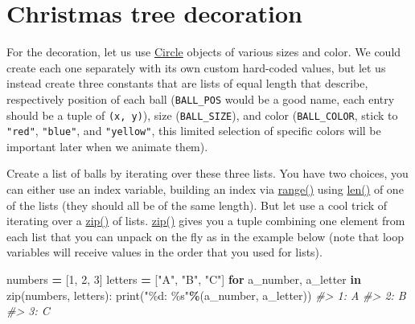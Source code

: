 \documentclass[
]{book}
\newenvironment{Shaded}{\begin{snugshade}}{\end{snugshade}}
\newcommand{\BuiltInTok}[1]{#1}
\newcommand{\CommentTok}[1]{\textcolor[rgb]{0.56,0.35,0.01}{\textit{#1}}}
\newcommand{\ControlFlowTok}[1]{\textcolor[rgb]{0.13,0.29,0.53}{\textbf{#1}}}
\newcommand{\DecValTok}[1]{\textcolor[rgb]{0.00,0.00,0.81}{#1}}
\newcommand{\KeywordTok}[1]{\textcolor[rgb]{0.13,0.29,0.53}{\textbf{#1}}}
\newcommand{\NormalTok}[1]{#1}
\newcommand{\OperatorTok}[1]{\textcolor[rgb]{0.81,0.36,0.00}{\textbf{#1}}}
\newcommand{\SpecialCharTok}[1]{\textcolor[rgb]{0.00,0.00,0.00}{#1}}
\newcommand{\StringTok}[1]{\textcolor[rgb]{0.31,0.60,0.02}{#1}}
\begin{document}
\hypertarget{christmas-tree-decoration}{%
\section{Christmas tree decoration}\label{christmas-tree-decoration}}

For the decoration, let us use \href{https://psychopy.org/api/visual/circle.html\#psychopy.visual.circle.Circle}{Circle} objects of various sizes and color. We could create each one separately with its own custom hard-coded values, but let us instead create three constants that are lists of equal length that describe, respectively position of each ball (\texttt{BALL\_POS} would be a good name, each entry should be a tuple of \texttt{(x,\ y)}), size (\texttt{BALL\_SIZE}), and color (\texttt{BALL\_COLOR}, stick to \texttt{"red"}, \texttt{"blue"}, and \texttt{"yellow"}, this limited selection of specific colors will be important later when we animate them).

Create a list of balls by iterating over these three lists. You have two choices, you can either use an index variable, building an index via \href{https://docs.python.org/3/library/functions.html\#func-range}{range()} using \href{https://docs.python.org/3/library/functions.html\#len}{len()} of one of the lists (they should all be of the same length). But let use a cool trick of iterating over a \href{https://docs.python.org/3/library/functions.html\#zip}{zip()} of lists. \href{https://docs.python.org/3/library/functions.html\#zip}{zip()} gives you a tuple combining one element from each list that you can unpack on the fly as in the example below (note that loop variables will receive values in the order that you used for lists).

\begin{Shaded}
\begin{Highlighting}[]
\NormalTok{numbers }\OperatorTok{=}\NormalTok{ [}\DecValTok{1}\NormalTok{, }\DecValTok{2}\NormalTok{, }\DecValTok{3}\NormalTok{]}
\NormalTok{letters }\OperatorTok{=}\NormalTok{ [}\StringTok{"A"}\NormalTok{, }\StringTok{"B"}\NormalTok{, }\StringTok{"C"}\NormalTok{]}
\ControlFlowTok{for}\NormalTok{  a\_number, a\_letter }\KeywordTok{in}  \BuiltInTok{zip}\NormalTok{(numbers, letters):}
  \BuiltInTok{print}\NormalTok{(}\StringTok{"}\SpecialCharTok{\%d}\StringTok{: }\SpecialCharTok{\%s}\StringTok{"}\OperatorTok{\%}\NormalTok{(a\_number, a\_letter))}
\CommentTok{\#\textgreater{} 1: A}
\CommentTok{\#\textgreater{} 2: B}
\CommentTok{\#\textgreater{} 3: C}
\end{Highlighting}
\end{Shaded}
\end{document}
